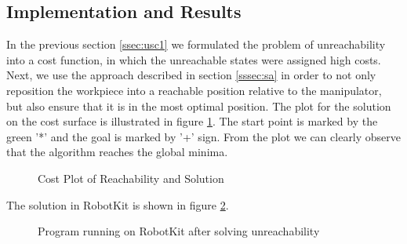 \subsection{Implementation and Results}
In the previous section \ref{ssec:usc1} we formulated the problem of unreachability into a cost function, in which the unreachable states were assigned high costs. Next, we use the approach described in section \ref{sssec:sa} in order to not only reposition the workpiece into a reachable position relative to the manipulator, but also ensure that it is in the most optimal position. The plot for the solution on the cost surface is illustrated in figure \ref{fig:rc4}. The start point is marked by the green '*' and the goal is marked by '+' sign. From the plot we can clearly observe that the algorithm reaches the global minima. 
\begin{figure}[!ht] %
	\centering
	\caption{Cost Plot of Reachability and Solution }
	\label{fig:rc4}
\end{figure}
The solution in RobotKit is shown in figure \ref{fig:rc5}.
\begin{figure}[!ht] %
	\centering
	\caption{Program running on RobotKit after solving unreachability}
	\label{fig:rc5}
\end{figure}
\clearpage


